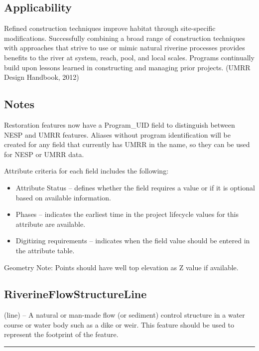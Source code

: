\documentclass[
  letterpaper,
  DIV=11,
  numbers=noendperiod]{scrreprt}
\providecommand{\tightlist}{%
  \setlength{\itemsep}{0pt}\setlength{\parskip}{0pt}}
\begin{document}
\subsection{Applicability}\label{applicability-13}

Refined construction techniques improve habitat through site-specific
modifications. Successfully combining a broad range of construction
techniques with approaches that strive to use or mimic natural riverine
processes provides benefits to the river at system, reach, pool, and
local scales. Programs continually build upon lessons learned in
constructing and managing prior projects. (UMRR Design Handbook, 2012)

\subsection{Notes}\label{notes-15}

Restoration features now have a Program\_UID field to distinguish
between NESP and UMRR features. Aliases without program identification
will be created for any field that currently has UMRR in the name, so
they can be used for NESP or UMRR data.

Attribute criteria for each field includes the following:

\begin{itemize}
\tightlist
\item
  Attribute Status -- defines whether the field requires a value or if
  it is optional based on available information.
\item
  Phases -- indicates the earliest time in the project lifecycle values
  for this attribute are available.
\item
  Digitizing requirements -- indicates when the field value should be
  entered in the attribute table.
\end{itemize}

Geometry Note: Points should have well top elevation as Z value if
available.

\subsection{RiverineFlowStructureLine}\label{riverineflowstructureline}

(line) -- A natural or man-made flow (or sediment) control structure in
a water course or water body such as a dike or weir. This feature should
be used to represent the footprint of the feature.

\begin{center}\rule{0.5\linewidth}{0.5pt}\end{center}
\end{document}
